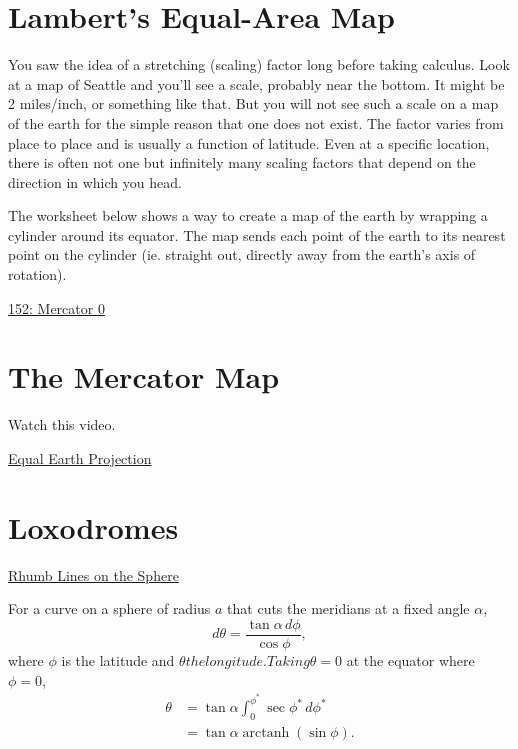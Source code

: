 \documentclass{ximera}
\begin{document}
\section{Lambert's Equal-Area Map}


You saw the idea of a stretching (scaling) factor long before taking calculus. Look at a map of Seattle and you'll see a scale, probably near the bottom. It might be 2 miles/inch, or something like that. But you will not see such a scale on a map of the earth for the simple reason that one does not exist. The factor varies from place to place and is usually a function of latitude. Even at a specific location, there is often not one but infinitely many scaling factors that depend on the direction in which you head. 

The worksheet below shows a way to create a map of the earth by wrapping a cylinder around its equator. The map sends each point of the earth to its nearest point on the cylinder (ie. straight out, directly away from the earth's axis of rotation).

\begin{onlineOnly}
    \begin{center}
\end{center}
\end{onlineOnly}

\href{https://www.desmos.com/3d/ehyvvttdeo}{152: Mercator 0}



\section{The Mercator Map}

Watch this video.

\href{https://www.nytimes.com/2025/08/19/world/africa/africa-map-mercator.html}{Equal Earth Projection}


\section{Loxodromes}

\href{https://mathcurve.com/courbes3d.gb/loxodromie/sphereloxodromie.shtml}{Rhumb Lines on the Sphere}

For a curve on a sphere of radius $a$ that cuts the meridians at a fixed angle $\alpha$,
\[
  d\theta = \frac{\tan \alpha \, d\phi}{\cos\phi} ,
\]
where $\phi$ is the latitude and $\theta the longitude. Taking \theta = 0$ at the equator where $\phi=0$,
\begin{align*}
 \theta     &= \tan \alpha \int_0^{\phi^*} \sec \phi^* \, d\phi^*\\
               &= \tan \alpha \operatorname{arctanh}(\sin\phi) .
\end{align*}
\end{document}
